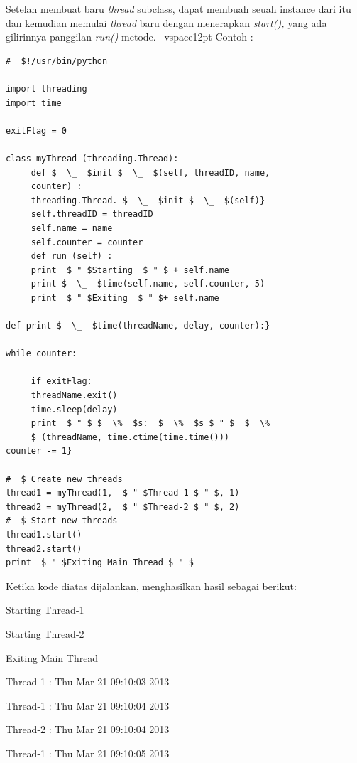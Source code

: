 \begin{itemize}
\vspace{12pt}
\hspace*{0.5in} Setelah membuat baru \textit{thread} subclass, dapat membuah seuah instance dari itu dan kemudian memulai \textit{thread} baru dengan menerapkan \textit{start(),} yang ada gilirinnya panggilan \textit{run()} metode. 
\
vspace{12pt}
Contoh :
\begin{verbatim} 
#  $!/usr/bin/python
 
import threading
import time
 
exitFlag = 0
 
class myThread (threading.Thread): 
     def $  \_  $init $  \_  $(self, threadID, name, 
     counter) :
     threading.Thread. $  \_  $init $  \_  $(self)} 
     self.threadID = threadID
     self.name = name 
     self.counter = counter 
     def run (self) :
     print  $ " $Starting  $ " $ + self.name 
     print $  \_  $time(self.name, self.counter, 5)
     print  $ " $Exiting  $ " $+ self.name
 
def print $  \_  $time(threadName, delay, counter):} 

while counter:
 
     if exitFlag: 
     threadName.exit() 
     time.sleep(delay) 
     print  $ " $ $  \%  $s:  $  \%  $s $ " $  $  \%  
     $ (threadName, time.ctime(time.time()))
counter -= 1} 
 
#  $ Create new threads
thread1 = myThread(1,  $ " $Thread-1 $ " $, 1)
thread2 = myThread(2,  $ " $Thread-2 $ " $, 2)
#  $ Start new threads
thread1.start()
thread2.start()
print  $ " $Exiting Main Thread $ " $
\end{verbatim}

\vspace{12pt}
Ketika kode diatas dijalankan, menghasilkan hasil sebagai berikut:

{\fontsize{10pt}{10pt}\selectfont Starting Thread-1} 
 
{\fontsize{10pt}{10pt}\selectfont Starting Thread-2} 
 
{\fontsize{10pt}{10pt}\selectfont Exiting Main Thread} 
 
{\fontsize{10pt}{10pt}\selectfont Thread-1 : Thu Mar 21 09:10:03 2013} 
 
{\fontsize{10pt}{10pt}\selectfont Thread-1 : Thu Mar 21 09:10:04 2013} 
 
{\fontsize{10pt}{10pt}\selectfont Thread-2 : Thu Mar 21 09:10:04 2013} 
 
{\fontsize{10pt}{10pt}\selectfont Thread-1 : Thu Mar 21 09:10:05 2013} 
 

\end{itemize}
